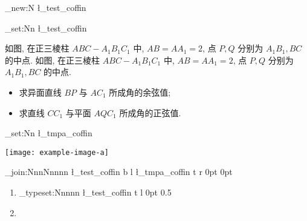 \documentclass{ctexart}
\begin{document}
\ExplSyntaxOn
\coffin_new:N \l_test_coffin

\hcoffin_set:Nn \l_test_coffin
  {
    \begin{varwidth}{\hsize}
      如图, 在正三棱柱 $A B C-A_{1} B_{1} C_{1}$ 中, $A B=A A_{1}=2$, 点 $P, Q$ 分别为 $A_{1} B_{1}, B C$ 的中点.
     如图, 在正三棱柱 $A B C-A_{1} B_{1} C_{1}$ 中, $A B=A A_{1}=2$, 点 $P, Q$ 分别为 $A_{1} B_{1}, B C$ 的中点.
      \begin{itemize}
        \item 求异面直线 $B P$ 与 $A C_{1}$ 所成角的余弦值;
        \item 求直线 $C C_{1}$ 与平面 $A Q C_{1}$ 所成角的正弦值.
      \end{itemize}
    \end{varwidth}
  }
\hcoffin_set:Nn \l_tmpa_coffin
  {
    \begin{varwidth}{\hsize}
      \texttt{[image: example-image-a]}
    \end{varwidth}
  }
\coffin_join:NnnNnnnn
  \l_test_coffin { b } { l }
  \l_tmpa_coffin { t } { r }
  { 0pt } { 0pt }
\begin{enumerate}
  \item \coffin_typeset:Nnnnn 
    \l_test_coffin { t } { l }
    { 0pt } { 0.5\baselineskip }
  \item {}
\end{enumerate}


\ExplSyntaxOff
\end{document}
